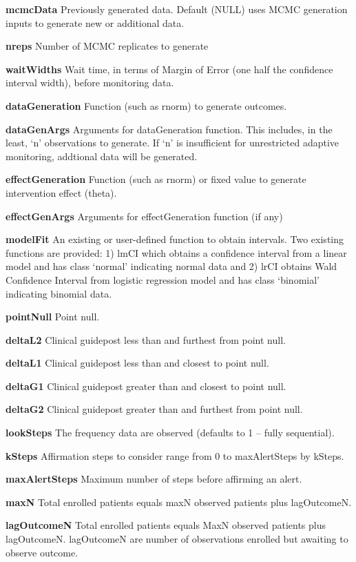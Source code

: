 \documentclass[12pt,oneside]{book}
\newlength{\li}\setlength{\li}{14.48pt}
\newlength{\di}\setlength{\di}{-3.5mm}
\theoremstyle{definition}
\theoremstyle{definition}
\theoremstyle{definition}
\theoremstyle{remark}
\begin{document}
\textbf{mcmcData} Previously generated data. Default (NULL) uses MCMC
generation inputs to generate new or additional data.

\textbf{nreps} Number of MCMC replicates to generate

\textbf{waitWidths} Wait time, in terms of Margin of Error (one half the
confidence interval width), before monitoring data.

\textbf{dataGeneration} Function (such as rnorm) to generate outcomes.

\textbf{dataGenArgs} Arguments for dataGeneration function. This
includes, in the least, `n' observations to generate. If `n' is
insufficient for unrestricted adaptive monitoring, addtional data will
be generated.

\textbf{effectGeneration} Function (such as rnorm) or fixed value to
generate intervention effect (theta).

\textbf{effectGenArgs} Arguments for effectGeneration function (if any)

\textbf{modelFit} An existing or user-defined function to obtain
intervals. Two existing functions are provided: 1) lmCI which obtains a
confidence interval from a linear model and has class `normal'
indicating normal data and 2) lrCI obtains Wald Confidence Interval from
logistic regression model and has class `binomial' indicating binomial
data.

\textbf{pointNull} Point null.

\textbf{deltaL2} Clinical guidepost less than and furthest from point
null.

\textbf{deltaL1} Clinical guidepost less than and closest to point null.

\textbf{deltaG1} Clinical guidepost greater than and closest to point
null.

\textbf{deltaG2} Clinical guidepost greater than and furthest from point
null.

\textbf{lookSteps} The frequency data are observed (defaults to 1 --
fully sequential).

\textbf{kSteps} Affirmation steps to consider range from 0 to
maxAlertSteps by kSteps.

\textbf{maxAlertSteps} Maximum number of steps before affirming an
alert.

\textbf{maxN} Total enrolled patients equals maxN observed patients plus
lagOutcomeN.

\textbf{lagOutcomeN} Total enrolled patients equals MaxN observed
patients plus lagOutcomeN. lagOutcomeN are number of observations
enrolled but awaiting to observe outcome.
\end{document}
